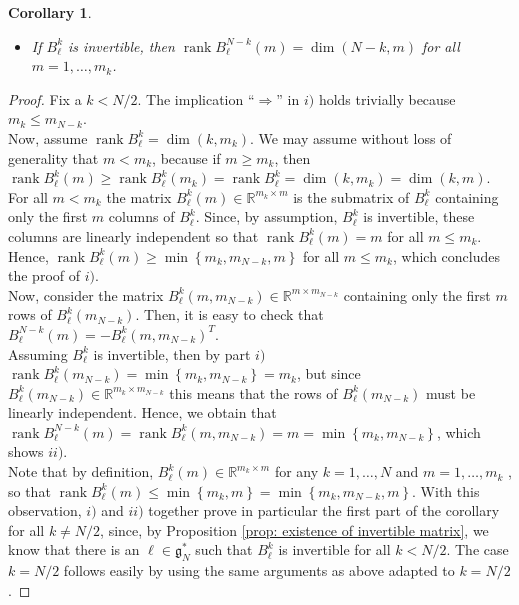 \documentclass[pdflatex,sn-mathphys-num]{sn-jnl}
\theoremstyle{thmstyletwo}
\theoremstyle{thmstyleone}
\newtheorem{corollary}[definition]{Corollary}
\theoremstyle{thmstyletwo}
\newcommand{\fancyg}{\mathfrak{g}}
\newcommand{\R}{\mathbb{R}}
\newcommand{\rank}{\operatorname{rank}}
\begin{document}
\begin{corollary}
\begin{itemize}
			\item[ii)] If $B_{\ell}^k$ is invertible, then $\operatorname{rank}B_{\ell}^{N-k}(m) = \dim(N-k,m)$ for all $m = 1, \ldots, m_{k}$.
		\end{itemize}
	\end{corollary}
	\begin{proof} Fix a $k < N/2$. The implication ``$\Rightarrow$'' in $i)$ holds trivially because $m_k \leq m_{N-k}$. \\
		Now, assume $\rank B_{\ell}^k = \dim(k,m_k)$. We may assume without loss of generality that $m < m_k$, because if $m\geq m_k$, then $\operatorname{rank} B_{\ell}^k(m) \geq \operatorname{rank} B_{\ell}^k(m_k) = \rank B_{\ell}^k = \dim(k,m_k) = \dim(k,m)$.\\
		For all $m< m_k$ the matrix $B_{\ell}^k(m) \in \mathbb{R}^{m_k\times m}$ is the submatrix of $B_{\ell}^k$ containing only the first $m$ columns of $B_{\ell}^k$. Since, by assumption, $B_{\ell}^k$ is invertible, these columns are linearly independent so that 
		$\operatorname{rank} B_{\ell}^k(m) = m$ for all $m \leq m_k$. Hence, $\operatorname{rank} B_{\ell}^k(m) \geq \min\left\{m_k,m_{N-k},m\right\}$ for all $m \leq m_k$, which concludes the proof of $i)$.\\
		Now, consider the matrix $B_{\ell}^k(m,m_{N-k}) \in \R^{m \times m_{N-k}}$ containing only the first $m$ rows of $B_{\ell}^k(m_{N-k})$. Then, it is easy to check that $B_{\ell}^{N-k}(m) = -B_{\ell}^k(m,m_{N-k})^T$.\\
		Assuming $B_{\ell}^k$ is invertible, then by part $i)$ $\rank B_{\ell}^k(m_{N-k}) = \min\left\{m_k,m_{N-k}\right\} = m_k$, but since $B_{\ell}^k(m_{N-k}) \in \R^{m_k \times m_{N-k}}$ this means that the rows of $B_{\ell}^k(m_{N-k})$ must be linearly independent. Hence, we obtain that $\rank B_{\ell}^{N-k}(m) = \rank B_{\ell}^k(m,m_{N-k}) = m = \min\left\{m_k,m_{N-k}\right\}$, which shows $ii)$. \\
		Note that by definition, $B_{\ell}^k(m) \in \mathbb{R}^{m_k\times m}$ for any $k = 1, \ldots, N$ and $m = 1, \ldots, m_k$ , so that $\operatorname{rank} B_{\ell}^k(m)\leq \min\left\{m_k,m\right\} = \min\left\{m_k,m_{N-k},m\right\}$. With this observation, $i)$ and $ii)$ together prove in particular the first part of the corollary for all $k \neq N/2$, since, by Proposition \ref{prop: existence of invertible matrix}, we know that there is an $\ell \in \fancyg_N^*$ such that $B_{\ell}^k$ is invertible for all $k <N/2$. The case $k=N/2$ follows easily by using the same arguments as above adapted to $k =N/2$.        

\end{proof}
\end{document}
